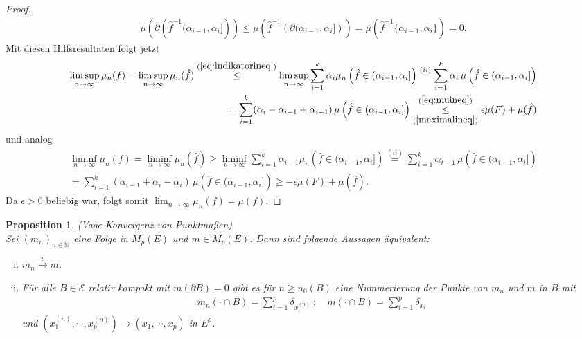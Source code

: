 \documentclass[twoside]{article}
\newtheorem{proposition}[theorem]{Proposition}
\theoremstyle{definition}
\begin{document}
\begin{proof}
\begin{align}
\mu \left(\partial \left(\hat{f}^{-1} (\alpha_{i-1},\alpha_i]  \right) \right) \leq \mu \left(\hat{f}^{-1} \left(\partial (\alpha_{i-1},\alpha_i]  \right) \right) = \mu\left(\hat{f}^{-1}\{\alpha_{i-1},\alpha_i \} \right) = 0.
\end{align}
Mit diesen Hilfsresultaten folgt jetzt
\begin{align}
\limsup_{n \to \infty} \mu_n(f) = \limsup_{n \to \infty} \mu_n(\hat{f}) \overset{(\ref{eq:indikatorineq})}{\leq} \limsup_{n \to \infty} \sum_{i=1}^k \alpha_i \mu_n\left( \hat{f} \in (\alpha_{i-1},\alpha_i]\right) \overset{(ii)}{=} \sum_{i=1}^k \alpha_i \, \mu\left( \hat{f} \in (\alpha_{i-1},\alpha_i]\right) \\
= \sum_{i=1}^k (\alpha_i-\alpha_{i-1}+\alpha_{i-1}) \, \mu\left( \hat{f} \in (\alpha_{i-1},\alpha_i]\right) \underset{(\ref{maximalineq})}{\overset{(\ref{eq:muineq})}{\leq}} \epsilon \mu(F) + \mu(\hat{f})
\end{align}
und analog
\begin{align}
\liminf_{n \to \infty} \mu_n(f) = \liminf_{n \to \infty} \mu_n(\hat{f}) \geq \liminf_{n \to \infty} \sum_{i=1}^k \alpha_{i-1} \mu_n\left( \hat{f} \in (\alpha_{i-1},\alpha_i]\right) \overset{(ii)}{=} \sum_{i=1}^k \alpha_{i-1} \, \mu\left( \hat{f} \in (\alpha_{i-1},\alpha_i]\right) \\
= \sum_{i=1}^k (\alpha_{i-1}+\alpha_{i}-\alpha_{i}) \, \mu\left( \hat{f} \in (\alpha_{i-1},\alpha_i]\right) \geq -\epsilon \mu(F) + \mu(\hat{f}).
\end{align}
Da $\epsilon > 0$ beliebig war, folgt somit $\lim_{n \to \infty} \mu_n(f) = \mu(f)$.
\end{proof}
\begin{proposition} (Vage Konvergenz von Punktmaßen)\\
Sei $(m_n)_{n \in \mathbb{N}}$ eine Folge in $M_p(E)$ und $m \in M_p(E)$. Dann sind folgende Aussagen äquivalent:
\begin{enumerate}[(i)]
\item $m_n \xrightarrow{v} m$.
\item Für alle $B \in \mathcal{E}$ relativ kompakt mit $m(\partial B) = 0$ gibt es für $n \geq n_0(B)$ eine Nummerierung der Punkte von $m_n$ und $m$ in $B$ mit
\begin{align}
m_n(\cdot \cap B) = \sum_{i=1}^p \delta_{x_i^{(n)}} \; ; \quad m(\cdot \cap B) = \sum_{i=1}^p \delta_{x_i} \label{eq:pktmass}
\end{align}
und $(x_1^{(n)}, \cdots , x_p^{(n)}) \to (x_1, \cdots , x_p)$ in $E^p$.
\end{enumerate}
\end{proposition}
\end{document}
